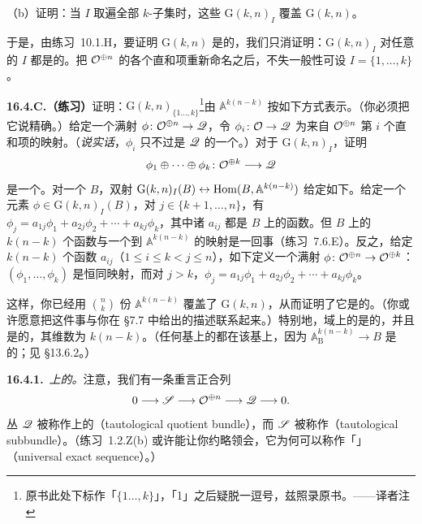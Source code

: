 （b）证明：当 $I$ 取遍全部 $k$-子集时，这些\trOpen\trSubfunctor{} $\mathrm{G}(k,n)_I$ 覆盖\trFunctor{} $\mathrm{G}(k,n)$。

于是，由\mbox{练习~10.1.H}，要证明 $\mathrm{G}(k,n)$ 是\trRepresentable{}的，我们只消证明：$\mathrm{G}(k,n)_I$ 对任意的 $I$ 都是\trRepresentable{}的。把 $\mathcal{O}^{\oplus n}$ 的各个直和项重新命名之后，不失一般性可设 $I=\{1,\dots,k\}$。

\textbf{16.4.C.（练习）}\quad 证明：$\mathrm{G}(k,n)_{\{1\ldots,k\}}$\footnote{原书此处下标作「$\{1\ldots,k\}$」，「1」之后疑脱一逗号，兹照录原书。——译者注}由 $\mathbb{A}^{k(n-k)}$ 按如下方式表示。（你必须把它说精确。）给定一个满射 $\phi\colon\mathcal{O}^{\oplus n}\to\mathscr{Q}$，令 $\phi_i\colon\mathcal{O}\to\mathscr{Q}$ 为来自 $\mathcal{O}^{\oplus n}$ 第 $i$ 个直和项的映射。（\emph{说实话}，$\phi_i$ 只不过是 $\mathscr{Q}$ 的一个\trSection{}。）对于\trOpen\trSubfunctor{} $\mathrm{G}(k,n)_I$，证明
\[
\phi_1\oplus\cdots\oplus\phi_k\colon\mathcal{O}^{\oplus k}\longrightarrow\mathscr{Q}
\]
是一个\trIsomorphism。对一个\trScheme{} $B$，双射 $\mathrm{G}(k,n)_I(B)\leftrightarrow\operatorname{Hom}(B,\mathbb{A}^{k(n-k)})$ 给定如下。给定一个元素 $\phi\in\mathrm{G}(k,n)_I(B)$，对 $j\in\{k+1,\dots,n\}$，有 $\phi_j=a_{1j}\phi_1+a_{2j}\phi_2+\cdots+a_{kj}\phi_k$，其中诸 $a_{ij}$ 都是 $B$ 上的函数。但 $B$ 上的 $k(n-k)$ 个函数与一个到 $\mathbb{A}^{k(n-k)}$ 的映射是一回事（\mbox{练习~7.6.E}）。反之，给定 $k(n-k)$ 个函数 $a_{ij}$（$1\le i\le k<j\le n$），如下定义一个满射 $\phi\colon\mathcal{O}^{\oplus n}\to\mathcal{O}^{\oplus k}$：$(\phi_1,\dots,\phi_k)$ 是恒同映射，而对 $j>k$，$\phi_j=a_{1j}\phi_1+a_{2j}\phi_2+\cdots+a_{kj}\phi_k$。

这样，你已经用 $\binom{n}{k}$ 份 $\mathbb{A}^{k(n-k)}$ 覆盖了 $\mathrm{G}(k,n)$，从而证明了它是\trRepresentable{}的。（你或许愿意把这件事与你在 \S7.7 中给出的描述联系起来。）特别地，域上的\trGrassmannian{}是\trSmooth{}的，并且是\trIrreducible{}的，其维数为 $k(n-k)$。（任何基上的\trGrassmannian{}都在该基上\trSmooth，因为 $\mathbb{A}_{\mathrm{B}}^{k(n-k)}\to B$ 是\trSmooth{}的；见 \S13.6.2。）

\textbf{16.4.1.}\ \emph{\trGrassmannian{}上的\trUniversalExactSequence。}\quad 注意，我们有一条重言正合列
\[
0\longrightarrow\mathscr{S}\longrightarrow\mathcal{O}^{\oplus n}\longrightarrow\mathscr{Q}\longrightarrow 0.
\]
丛 $\mathscr{Q}$ 被称作\trGrassmannian{}上的\textbf{\trTautologicalQuotientBundle}（tautological quotient bundle），而 $\mathscr{S}$ 被称作\textbf{\trTautologicalSubbundle}（tautological subbundle）。（\mbox{练习~1.2.Z}(b) 或许能让你约略领会，它为何可以称作「\trUniversalExactSequence」（universal exact sequence）。）

